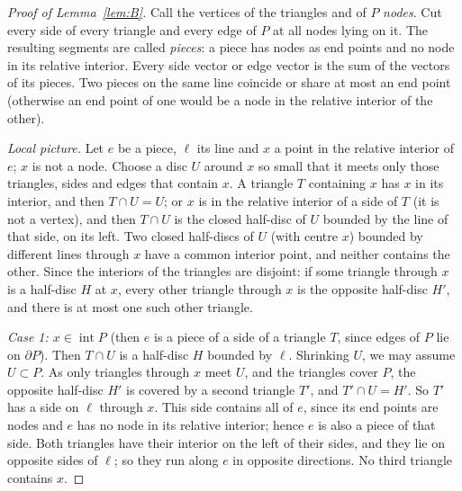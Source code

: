 \documentclass[11pt]{article}
\theoremstyle{definition}
\begin{document}
\begin{proof}[Proof of Lemma~\ref{lem:B}]
Call the vertices of the triangles and of $P$ \emph{nodes}. Cut every side of every triangle and
every edge of $P$ at all nodes lying on it. The resulting segments are called \emph{pieces}: a piece
has nodes as end points and no node in its relative interior. Every side vector or edge vector is
the sum of the vectors of its pieces. Two pieces on the same line coincide or share at most an end
point (otherwise an end point of one would be a node in the relative interior of the other).

\emph{Local picture.} Let $e$ be a piece, $\ell$ its line and $x$ a point in the relative interior
of $e$; $x$ is not a node. Choose a disc $U$ around $x$ so small that it meets only those triangles,
sides and edges that contain $x$. A triangle $T$ containing $x$ has $x$ in its interior, and then
$T\cap U=U$; or $x$ is in the relative interior of a side of $T$ (it is not a vertex), and then
$T\cap U$ is the closed half-disc of $U$ bounded by the line of that side, on its left. Two closed
half-discs of $U$ (with centre $x$) bounded by different lines through $x$ have a common interior
point, and neither contains the other. Since the interiors of the triangles are disjoint: if some
triangle through $x$ is a half-disc $H$ at $x$, every other triangle through $x$ is the opposite
half-disc $H'$, and there is at most one such other triangle.

\emph{Case 1: $x\in\operatorname{int}P$} (then $e$ is a piece of a side of a triangle $T$, since
edges of $P$ lie on $\partial P$). Then $T\cap U$ is a half-disc $H$ bounded by $\ell$. Shrinking
$U$, we may assume $U\subset P$. As only triangles through $x$ meet $U$, and the triangles cover
$P$, the opposite half-disc $H'$ is covered by a second triangle $T'$, and $T'\cap U=H'$. So $T'$
has a side on $\ell$ through $x$. This side contains all of $e$, since its end points are nodes and
$e$ has no node in its relative interior; hence $e$ is also a piece of that side. Both triangles
have their interior on the left of their sides, and they lie on opposite sides of $\ell$; so they run
along $e$ in opposite directions. No third triangle contains $x$.


\end{proof}
\end{document}
